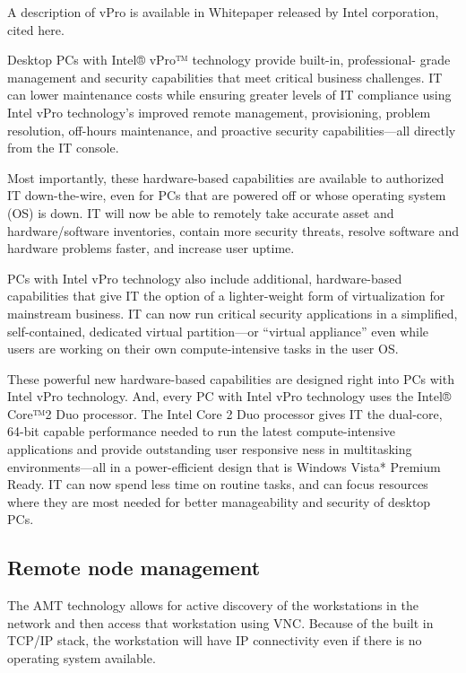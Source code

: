 A description of vPro is available in Whitepaper \cite{paper:intel-vpro}
released by Intel corporation, cited here.

Desktop PCs with Intel® vPro™ technology provide built-in, professional-
grade management and security capabilities that meet critical business
challenges. IT can lower maintenance costs while ensuring greater levels
of IT compliance using Intel vPro technology’s improved remote
management, provisioning, problem resolution, off-hours maintenance, and
proactive security capabilities—all directly from the IT console.

Most importantly, these hardware-based capabilities are available to
authorized IT down-the-wire, even for PCs that are powered off or whose
operating system (OS) is down. IT will now be able to remotely take
accurate asset and hardware/software inventories, contain more security
threats, resolve software and hardware problems faster, and increase
user uptime.

PCs with Intel vPro technology also include additional,
hardware-based capabilities that give IT the option of a lighter-weight
form of virtualization for mainstream business. IT can now run critical
security applications in a simplified, self-contained, dedicated virtual
partition—or “virtual appliance” even while users are working on their
own compute-intensive tasks in the user OS.

These powerful new hardware-based capabilities are designed right into
PCs with Intel vPro technology. And, every PC with Intel vPro technology
uses the Intel® Core™2 Duo processor. The Intel Core 2 Duo processor
gives IT the dual-core, 64-bit capable performance needed to run the
latest compute-intensive applications and provide outstanding user
responsive ness in multitasking environments—all in a power-efficient
design that is Windows Vista* Premium Ready. IT can now spend less time
on routine tasks, and can focus resources where they are most needed for
better manageability and security of desktop PCs.

\subsection{Remote node management}

The \ac{AMT} technology allows for active discovery of the workstations
in the network and then access that workstation using \ac{VNC}. Because
of the built in TCP/IP stack, the workstation will have IP connectivity
even if there is no operating system available.

